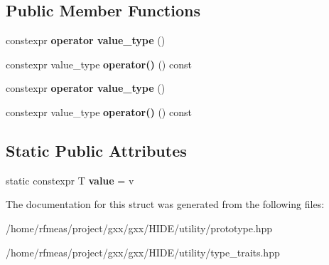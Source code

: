 \subsection*{Public Member Functions}
\begin{DoxyCompactItemize}
\item 
constexpr {\bfseries operator value\+\_\+type} ()\hypertarget{structintegral__constant_a65e891f4ed7ff8350d59aaf39cc20e77}{}\label{structintegral__constant_a65e891f4ed7ff8350d59aaf39cc20e77}

\item 
constexpr value\+\_\+type {\bfseries operator()} () const \hypertarget{structintegral__constant_a7adad4ae5a136b0b4fa85f8a5b4a0954}{}\label{structintegral__constant_a7adad4ae5a136b0b4fa85f8a5b4a0954}

\item 
constexpr {\bfseries operator value\+\_\+type} ()\hypertarget{structintegral__constant_a65e891f4ed7ff8350d59aaf39cc20e77}{}\label{structintegral__constant_a65e891f4ed7ff8350d59aaf39cc20e77}

\item 
constexpr value\+\_\+type {\bfseries operator()} () const \hypertarget{structintegral__constant_a7adad4ae5a136b0b4fa85f8a5b4a0954}{}\label{structintegral__constant_a7adad4ae5a136b0b4fa85f8a5b4a0954}

\end{DoxyCompactItemize}
\subsection*{Static Public Attributes}
\begin{DoxyCompactItemize}
\item 
static constexpr T {\bfseries value} = v\hypertarget{structintegral__constant_af8e69c0007bbeaf853b18fd088036db2}{}\label{structintegral__constant_af8e69c0007bbeaf853b18fd088036db2}

\end{DoxyCompactItemize}


The documentation for this struct was generated from the following files\+:\begin{DoxyCompactItemize}
\item 
/home/rfmeas/project/gxx/gxx/\+H\+I\+D\+E/utility/prototype.\+hpp\item 
/home/rfmeas/project/gxx/gxx/\+H\+I\+D\+E/utility/type\+\_\+traits.\+hpp\end{DoxyCompactItemize}
